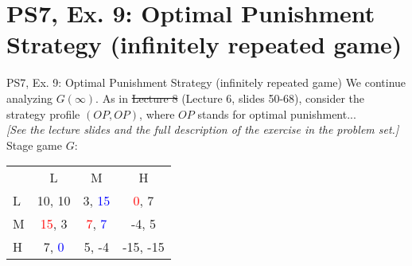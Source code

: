 \section{PS7, Ex. 9: Optimal Punishment Strategy (infinitely repeated game)}

\begin{frame}{PS7, Ex. 9: Optimal Punishment Strategy (infinitely repeated game)}
    We continue analyzing $G(\infty)$. As in \sout{Lecture 8} (Lecture 6, slides 50-68), consider the strategy profile $(OP,OP)$, where $OP$ stands for optimal punishment...\\\medskip
    \textit{[See the lecture slides and the full description of the exercise in the problem set.]}\\\medskip
    Stage game $G$:\vspace{-6pt}
    \begin{table}
      \begin{tabular}{l|c|c|c|}
        \multicolumn{1}{c}{} & \multicolumn{1}{c}{L} & \multicolumn{1}{c}{M} & \multicolumn{1}{c}{H} \\\cline{2-4}
        L & 10, 10 & 3, \textcolor{blue}{15} & \textcolor{red}{0}, 7 \\\cline{2-4}
        M & \textcolor{red}{15}, 3 & \textcolor{red}{7}, \textcolor{blue}{7} & -4, 5 \\\cline{2-4}
        H & 7, \textcolor{blue}{0} & 5, -4 & -15, -15 \\\cline{2-4}
      \end{tabular}
    \end{table}
\end{frame}

